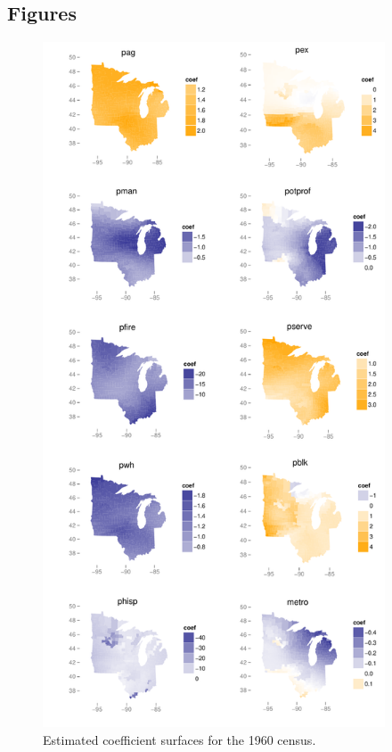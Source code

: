 \documentclass[authoryear, review, 11pt]{elsarticle}
\begin{document}
	\subsection{Figures}
	\begin{figure}
		\begin{center}
			\includegraphics[height=8in]{../../figures/poverty/1960.linear.coefficients.pdf}
			\caption{Estimated coefficient surfaces for the 1960 census.\label{fig:1960}}
		\end{center}
	\end{figure}
\end{document}
